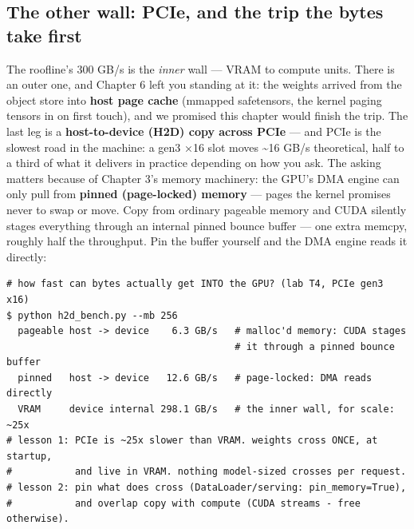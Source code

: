 \subsection*{The other wall: PCIe, and the trip the bytes take first}

The roofline's 300 GB/s is the \textit{inner} wall — VRAM to compute units. There is an outer one, and Chapter 6 left you standing at it: the weights arrived from the object store into \textbf{host page cache} (mmapped safetensors, the kernel paging tensors in on first touch), and we promised this chapter would finish the trip. The last leg is a \textbf{host-to-device (H2D) copy across PCIe} — and PCIe is the slowest road in the machine: a gen3 ×16 slot moves \textasciitilde{}16 GB/s theoretical, half to a third of what it delivers in practice depending on how you ask. The asking matters because of Chapter 3's memory machinery: the GPU's DMA engine can only pull from \textbf{pinned (page-locked) memory} — pages the kernel promises never to swap or move. Copy from ordinary pageable memory and CUDA silently stages everything through an internal pinned bounce buffer — one extra memcpy, roughly half the throughput. Pin the buffer yourself and the DMA engine reads it directly:

\begin{terminalbox}
\begin{Verbatim}[breaklines=true,breakanywhere=true,fontsize=\small,formatcom=\color{tbbtermfg},codes=\tbbcodeactive]
# how fast can bytes actually get INTO the GPU? (lab T4, PCIe gen3 x16)
$ python h2d_bench.py --mb 256
  pageable host -> device    6.3 GB/s   # malloc'd memory: CUDA stages
                                        # it through a pinned bounce buffer
  pinned   host -> device   12.6 GB/s   # page-locked: DMA reads directly
  VRAM     device internal 298.1 GB/s   # the inner wall, for scale: ~25x
# lesson 1: PCIe is ~25x slower than VRAM. weights cross ONCE, at startup,
#           and live in VRAM. nothing model-sized crosses per request.
# lesson 2: pin what does cross (DataLoader/serving: pin_memory=True),
#           and overlap copy with compute (CUDA streams - free otherwise).
\end{Verbatim}
\end{terminalbox}

